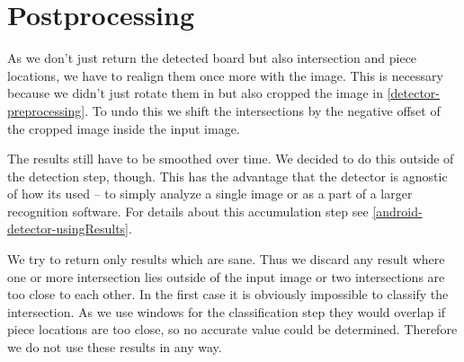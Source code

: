 	\section{Postprocessing}
	As we don't just return the detected board but also intersection and piece locations, we have to realign them once more with the image. This is necessary because we didn't just rotate them in but also cropped the image in \autoref{detector-preprocessing}. To undo this we shift the intersections by the negative offset of the cropped image inside the input image.

	The results still have to be smoothed over time. We decided to do this outside of the detection step, though. This has the advantage that the detector is agnostic of how its used -- to simply analyze a single image or as a part of a larger recognition software. For details about this accumulation step see \autoref{android-detector-usingResults}.

	We try to return only results which are sane. Thus we discard any result where one or more intersection lies outside of the input image or two intersections are too close to each other. In the first case it is obviously impossible to classify the intersection. As we use windows for the classification step they would overlap if piece locations are too close, so no accurate value could be determined. Therefore we do not use these results in any way.
